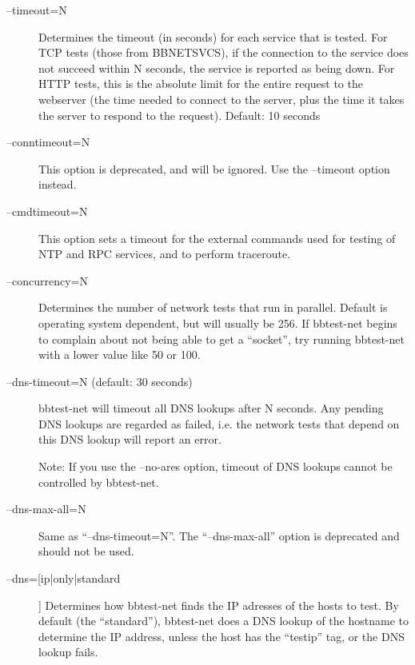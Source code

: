 \begin{description}

\item[--timeout=N] Determines the timeout (in seconds) for each
  service that is tested. For TCP tests (those from BBNETSVCS), if the
  connection to the service does not succeed within N seconds, the
  service is reported as being down. For HTTP tests, this is the
  absolute limit for the entire request to the webserver (the time
  needed to connect to the server, plus the time it takes the server
  to respond to the request). Default: 10 seconds 



 

\item[--conntimeout=N] This option is deprecated, and will be
  ignored. Use the --timeout option instead. 


 

\item[--cmdtimeout=N] This option sets a timeout for the external
  commands used for testing of NTP and RPC services, and to perform
  traceroute. 


 

\item[--concurrency=N] Determines the number of network tests that run
  in parallel. Default is operating system dependent, but will usually
  be 256. If bbtest-net begins to complain about not being able to get
  a ``socket'', try running bbtest-net with a lower value like 50 or
  100. 


 

\item[--dns-timeout=N (default: 30 seconds)] bbtest-net will timeout
  all DNS lookups after N seconds. Any pending DNS lookups are
  regarded as failed, i.e. the network tests that depend on this DNS
  lookup will report an error.  

 Note: If you use the --no-ares option, timeout of DNS lookups cannot
 be controlled by bbtest-net. 


\item[--dns-max-all=N] Same as ``--dns-timeout=N''. The
  ``--dns-max-all'' option is deprecated and should not be used. 
 

\item[--dns=[ip|only|standard]] Determines how bbtest-net finds the IP
  adresses of the hosts to test. By default (the ``standard''),
  bbtest-net does a DNS lookup of the hostname to determine the IP
  address, unless the host has the ``testip'' tag, or the DNS lookup
  fails.  


\end{description}
